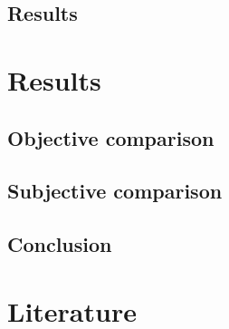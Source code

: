 \documentclass{article}
\begin{document}
\subsection{Results}

\newpage
\section{Results}
\subsection{Objective comparison}
\subsection{Subjective comparison}
\subsection{Conclusion}

\newpage
\section{Literature}
\end{document}
